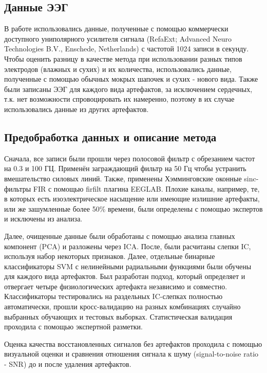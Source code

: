 \documentclass[12pt, a4paper, titlepage]{extreport}
\begin{document}
	\subsection*{Данные ЭЭГ}
	В работе использовались данные, полученные с помощью коммерчески доступного униполярного усилителя сигнала (RefaExt; Advanced Neuro Technologies B.V., Enschede, Netherlands) с частотой 1024 записи в секунду. Чтобы оценить разницу в качестве метода при использовании разных типов электродов (влажных и сухих) и их количества, использовались данные, полученные с помощью обычных мокрых шапочек и сухих - нового вида.
	Также были записаны ЭЭГ для каждого вида артефактов, за исключением сердечных, т.к. нет возможности спровоцировать их намеренно, поэтому в их случае использовались данные из других артефактов.
	\subsection*{Предобработка данных и описание метода}
	Сначала, все записи были прошли через полосовой фильтр с обрезанием частот на 0.3 и 100 ГЦ. Применён заграждающий фильтр на 50 Гц чтобы устранить вмешательство силовых линий. Также, применены Хэмминговские оконные sinc-фильтры FIR с помощью firfilt плагина EEGLAB. Плохие каналы, например, те, в которых есть изоэлектрическое насыщение или имеющие излишние артефакты, или же зашумленные более 50\% времени, были определены с помощью экспертов и исключены из анализа.
	
	Далее, очищенные данные были обработаны с помощью анализа главных компонент (PCA) и разложены через ICA. После, были расчитаны слепки IC, используя набор некоторых признаков. Далее, отдельные бинарные классификаторы SVM с нелинейными радиальными функциями были обучены для каждого вида артефактов. Был разработан подход, который определяет и отвергает четыре физиологических артефакта независимо и совместно. Классификаторы тестировались на раздельных IC-слепках полностью автоматически, прошли кросс-валидацию на разных комбинациях случайно выбранных обучающих и тестовых выборках. Статистическая валидация проходила с помощью экспертной разметки.
	
	Оценка качества восстановленных сигналов без артефактов проходила с помощью визуальной оценки и сравнения отношения сигнала к шуму (signal-to-noise ratio - SNR) до и после удаления артефактов.
\end{document}
